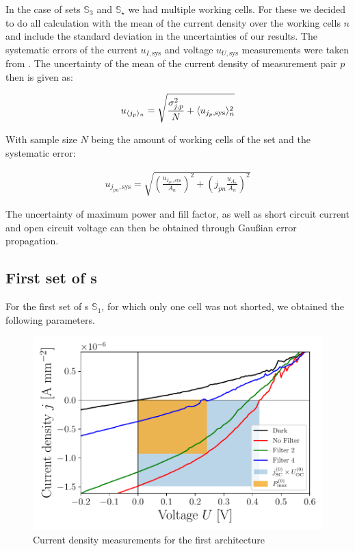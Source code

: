 In the case of sets $\mathbb{S}_3$ and $\mathbb{S}_\star$ we had multiple working cells. For these we decided to do all calculation with the mean of the current density over the working cells $n$ and include the standard deviation in the uncertainties of our results. The systematic errors of the current $u_{I,\text{sys}}$ and voltage $u_{U,\text{sys}}$ measurements were taken from \cite{keithley}. The uncertainty of the mean of the current density of measurement pair $p$ then is given as:

\begin{align}
u_{\langle j_p \rangle_n} = \sqrt{\frac{\sigma_{j,p}^2}{N} + \langle u_{j_p,\text{sys}} \rangle_n^2}
\end{align}

With sample size $N$ being the amount of working cells of the set and the systematic error:

\begin{align}
u_{j_{pn},\text{sys}} = \sqrt{ \left( \frac{ u_{I_{pn},\text{sys}}}{A_n}\right)^2+\left( j_{pn}\frac{u_{A_n}}{A_n} \right)^2}
\end{align}

The uncertainty of maximum power and fill factor, as well as short circuit current and open circuit voltage can then be obtained through Gaußian error propagation.

\subsection{First set of \BHSC s}

For the first set of \BHSC s $\mathbb{S}_1$, for which only one cell was not shorted, we obtained the following parameters.

\begin{figure}[h]\centering
\includegraphics[width=\columnwidth]{../../../IV-Curve-Analysis/OSC1Graph.pdf}
\caption{Current density measurements for the first architecture}
\label{fig:OSC1Graph}
\end{figure}


